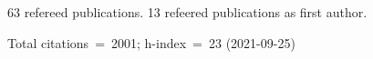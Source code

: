 63 refereed publications. 13 refeered publications as first author.

Total citations~=~2001; h-index~=~23 (2021-09-25)